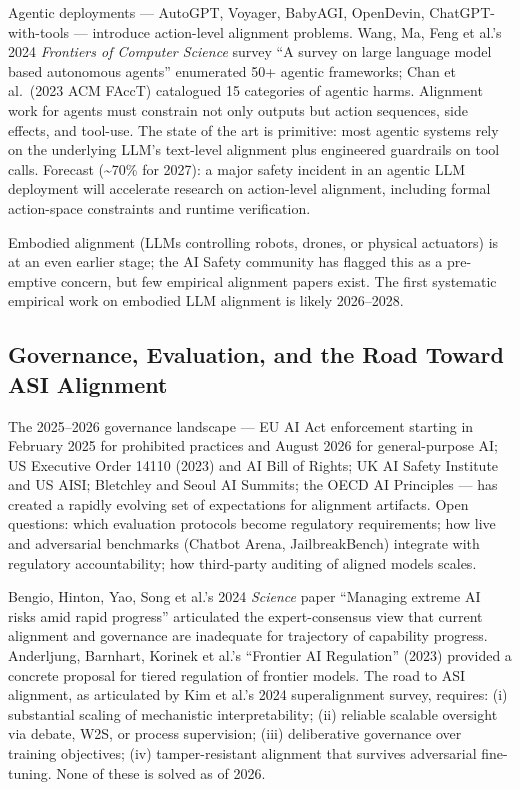 \documentclass{article}
\begin{document}
Agentic deployments --- AutoGPT, Voyager, BabyAGI, OpenDevin, ChatGPT-with-tools --- introduce action-level alignment problems. Wang, Ma, Feng et al.'s 2024 \emph{Frontiers of Computer Science} survey ``A survey on large language model based autonomous agents'' enumerated 50+ agentic frameworks; Chan et al.~(2023 ACM FAccT) catalogued 15 categories of agentic harms. Alignment work for agents must constrain not only outputs but action sequences, side effects, and tool-use. The state of the art is primitive: most agentic systems rely on the underlying LLM's text-level alignment plus engineered guardrails on tool calls. Forecast (\textasciitilde70\% for 2027): a major safety incident in an agentic LLM deployment will accelerate research on action-level alignment, including formal action-space constraints and runtime verification.

Embodied alignment (LLMs controlling robots, drones, or physical actuators) is at an even earlier stage; the AI Safety community has flagged this as a pre-emptive concern, but few empirical alignment papers exist. The first systematic empirical work on embodied LLM alignment is likely 2026--2028.

\subsection{Governance, Evaluation, and the Road Toward ASI Alignment}\label{governance-evaluation-and-the-road-toward-asi-alignment}

The 2025--2026 governance landscape --- EU AI Act enforcement starting in February 2025 for prohibited practices and August 2026 for general-purpose AI; US Executive Order 14110 (2023) and AI Bill of Rights; UK AI Safety Institute and US AISI; Bletchley and Seoul AI Summits; the OECD AI Principles --- has created a rapidly evolving set of expectations for alignment artifacts. Open questions: which evaluation protocols become regulatory requirements; how live and adversarial benchmarks (Chatbot Arena, JailbreakBench) integrate with regulatory accountability; how third-party auditing of aligned models scales.

Bengio, Hinton, Yao, Song et al.'s 2024 \emph{Science} paper ``Managing extreme AI risks amid rapid progress'' articulated the expert-consensus view that current alignment and governance are inadequate for trajectory of capability progress. Anderljung, Barnhart, Korinek et al.'s ``Frontier AI Regulation'' (2023) provided a concrete proposal for tiered regulation of frontier models. The road to ASI alignment, as articulated by Kim et al.'s 2024 superalignment survey, requires: (i) substantial scaling of mechanistic interpretability; (ii) reliable scalable oversight via debate, W2S, or process supervision; (iii) deliberative governance over training objectives; (iv) tamper-resistant alignment that survives adversarial fine-tuning. None of these is solved as of 2026.
\end{document}
